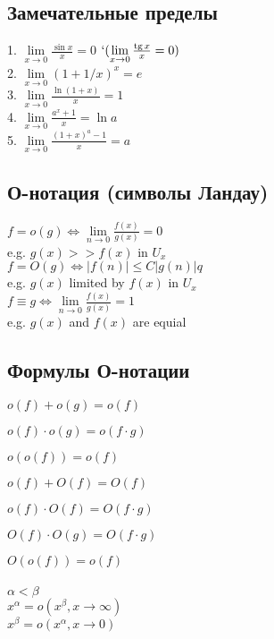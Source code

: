 \subsection{Замечательные пределы}

1. $ \lim\limits_{x\to 0} \frac{\sin{x}}{x} = 0$ $` (\lim\limits_{x\to 0} \frac{\operatorname{tg}{x}}{x} = 0) $ \\
2. $ \lim\limits_{x\to 0} (1 + 1/x)^x = e $ \\
3. $ \lim\limits_{x\to 0} \frac{\ln{(1+x)}}{x} = 1 $ \\
4. $ \lim\limits_{x\to 0} \frac{a^x + 1}{x} = \ln{a} $ \\
5. $ \lim\limits_{x\to 0} \frac{(1 + x)^a - 1}{x} = a $ \\

\subsection{О-нотация (символы Ландау)}

$f = o(g) \Leftrightarrow \lim\limits_{n \to 0} \frac{f(x)}{g(x)} = 0$ \\
e.g. $g(x) >> f(x)$ in $U_x$ \\

$f = O(g) \Leftrightarrow |f(n)| \le C|g(n)|q $ \\
e.g. $g(x) $ limited by $ f(x)$ in $U_x$ \\

$f \equiv g \Leftrightarrow \lim\limits_{n \to 0} \frac{f(x)}{g(x)} = 1 $ \\
e.g. $g(x)$ and $f(x)$ are equial \\

\subsection{Формулы О-нотации}

$o(f)+o(g) = o(f)$

$o(f) \cdot o(g) = o(f \cdot g)$

$o(o(f)) = o(f)$

$o(f)+O(f) = O(f)$

$o(f) \cdot O(f) = O(f \cdot g)$

$O(f) \cdot O(g) = O(f \cdot g)$

$O(o(f)) = o(f)$ \\\\

$ \alpha < \beta $ \\
$x^{\alpha} = o(x^{\beta}, x\to \infty ) $ \\
$x^{\beta} = o(x^{\alpha}, x\to 0 )$ \\

